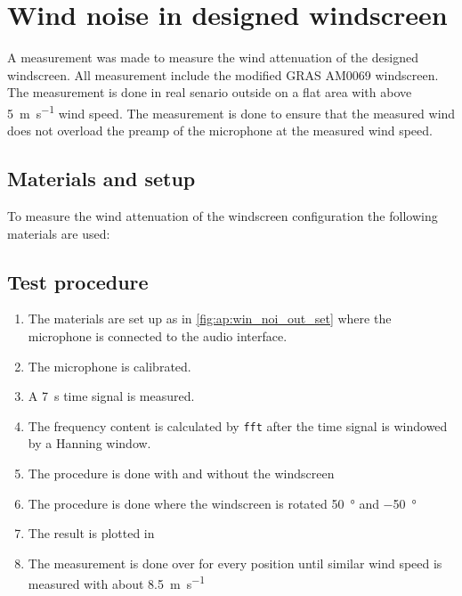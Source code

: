 \chapter{Wind noise in designed windscreen}\label{ap:wind_noise_in_design}
A measurement was made to measure the wind attenuation of the designed windscreen. All measurement include the modified GRAS AM0069 windscreen. The measurement is done in real senario outside on a flat area with above \SI{5}{\meter\per\second} wind speed. The measurement is done to ensure that the measured wind does not overload the preamp of the microphone at the measured wind speed.  


\section*{Materials and setup}
To measure the wind attenuation of the windscreen configuration the following materials are used:

\startequipment
{}
\stopequipment
\startequipment
\stopequipment



\section*{Test procedure}


\begin{enumerate}
\item The materials are set up as in \autoref{fig:ap:win_noi_out_set} where the microphone is connected to the audio interface.
\item The microphone is calibrated.
\item A \SI{7}{\second} time signal is measured.
\item The frequency content is calculated by \texttt{fft} after the time signal is windowed by a Hanning window.
\item The procedure is done with and without the windscreen
\item The procedure is done where the windscreen is rotated \SI{50}{\degree} and \SI{-50}{\degree}
\item The result is plotted in \matlab
\item The measurement is done over for every position until similar wind speed is measured with about \SI{8.5}{\meter\per\second}
\end{enumerate}

